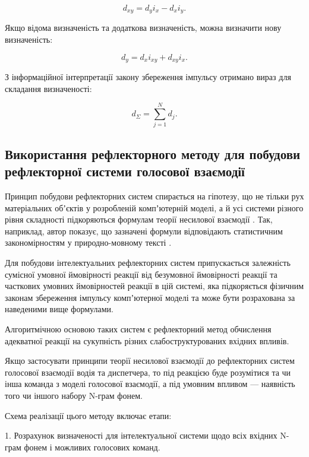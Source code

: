 \begin{equation}
\label{eq:tnv9}
d_{xy}=d_yi_x-d_xi_y.
\end{equation}

Якщо відома визначеність та додаткова визначеність, можна визначити нову визначеність:

\begin{equation}
\label{eq:tnv10}
d_y=d_xi_{xy}+d_{xy}i_x.
\end{equation}

З інформаційної інтерпретації закону збереження імпульсу отримано вираз для складання визначеності:

\begin{equation}
\label{eq:tnv11}
d_\Sigma = \sum_{j=1}^N d_j.
\end{equation}


\subsection{Використання рефлекторного методу для побудови рефлекторної системи голосової взаємодії} \label{subsect2_4_2}

Принцип побудови рефлекторних систем спирається на гіпотезу, що не тільки рух матеріальних обʼєктів у розробленій компʼютерній моделі, а й усі системи різного рівня складності підкоряються формулам теорії несилової взаємодії . Так, наприклад, автор показує, що зазначені формули відповідають статистичним закономірностям у природно-мовному тексті \cite[розділ 8]{Teslia_2010}.

Для побудови інтелектуальних рефлекторних систем припускається залежність сумісної умовної ймовірності реакції від безумовної ймовірності реакції та часткових умовних ймовірностей реакції в цій системі, яка підкоряється фізичним законам збереження імпульсу компʼютерної моделі та може бути розрахована за наведеними вище формулами.

Алгоритмічною основою таких систем є рефлекторний метод обчислення адекватної реакції на сукупність різних слабоструктурованих вхідних впливів.

Якщо застосувати принципи теорії несилової взаємодії до рефлекторних систем голосової взаємодії водія та диспетчера, то під реакцією буде розумітися та чи інша команда з моделі голосової взаємодії, а під умовним впливом --- наявність того чи іншого набору N-грам фонем.

Схема реалізації цього методу включає етапи:

1. Розрахунок визначеності для інтелектуальної системи щодо всіх вхідних N-грам фонем і можливих голосових команд.

